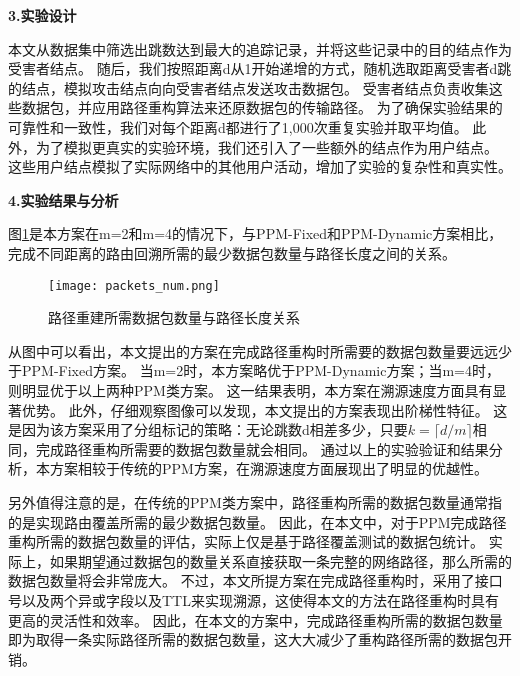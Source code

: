 \textbf{3.实验设计}\par
本文从数据集中筛选出跳数达到最大的追踪记录，并将这些记录中的目的结点作为受害者结点。
随后，我们按照距离d从1开始递增的方式，随机选取距离受害者d跳的结点，模拟攻击结点向向受害者结点发送攻击数据包。
受害者结点负责收集这些数据包，并应用路径重构算法来还原数据包的传输路径。
为了确保实验结果的可靠性和一致性，我们对每个距离d都进行了1,000次重复实验并取平均值。
此外，为了模拟更真实的实验环境，我们还引入了一些额外的结点作为用户结点。
这些用户结点模拟了实际网络中的其他用户活动，增加了实验的复杂性和真实性。\par
\textbf{4.实验结果与分析}


图\ref{fig:packets_num}是本方案在m=2和m=4的情况下，与PPM-Fixed和PPM-Dynamic方案相比，完成不同距离的路由回溯所需的最少数据包数量与路径长度之间的关系。
\begin{figure}[htbp]
  \centering
  \texttt{[image: packets\_num.png]}
  \caption{路径重建所需数据包数量与路径长度关系}
  \label{fig:packets_num}
\end{figure} 
从图中可以看出，本文提出的方案在完成路径重构时所需要的数据包数量要远远少于PPM-Fixed方案。
当m=2时，本方案略优于PPM-Dynamic方案；当m=4时，则明显优于以上两种PPM类方案。
这一结果表明，本方案在溯源速度方面具有显著优势。
此外，仔细观察图像可以发现，本文提出的方案表现出阶梯性特征。
这是因为该方案采用了分组标记的策略：无论跳数d相差多少，只要$k=\lceil d/m \rceil$相同，完成路径重构所需要的数据包数量就会相同。
通过以上的实验验证和结果分析，本方案相较于传统的PPM方案，在溯源速度方面展现出了明显的优越性。\par

另外值得注意的是，在传统的PPM类方案中，路径重构所需的数据包数量通常指的是实现路由覆盖所需的最少数据包数量。
因此，在本文中，对于PPM完成路径重构所需的数据包数量的评估，实际上仅是基于路径覆盖测试的数据包统计。
实际上，如果期望通过数据包的数量关系直接获取一条完整的网络路径，那么所需的数据包数量将会非常庞大。
不过，本文所提方案在完成路径重构时，采用了接口号以及两个异或字段以及TTL来实现溯源，这使得本文的方法在路径重构时具有更高的灵活性和效率。
因此，在本文的方案中，完成路径重构所需的数据包数量即为取得一条实际路径所需的数据包数量，这大大减少了重构路径所需的数据包开销。
